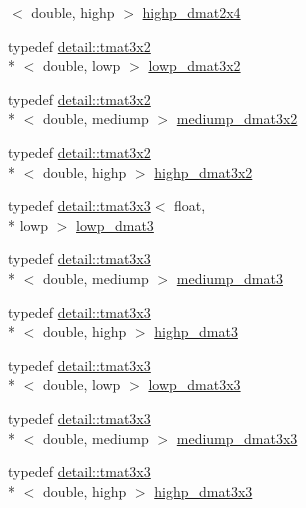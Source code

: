 \begin{DoxyCompactItemize}
$<$ double, highp $>$ \hyperlink{group__core__precision_gacd51d8188f7d66a83c035b8c4cd69f2d}{highp\-\_\-dmat2x4}
\item 
typedef \hyperlink{structglm_1_1detail_1_1tmat3x2}{detail\-::tmat3x2}\\*
$<$ double, lowp $>$ \hyperlink{group__core__precision_ga678c21e4fadeda255cfb146d40844bdd}{lowp\-\_\-dmat3x2}
\item 
typedef \hyperlink{structglm_1_1detail_1_1tmat3x2}{detail\-::tmat3x2}\\*
$<$ double, mediump $>$ \hyperlink{group__core__precision_gaff0060984716bcda68ff69ed27536bf6}{mediump\-\_\-dmat3x2}
\item 
typedef \hyperlink{structglm_1_1detail_1_1tmat3x2}{detail\-::tmat3x2}\\*
$<$ double, highp $>$ \hyperlink{group__core__precision_gac956fe6b946f0ccee78367ccd5427351}{highp\-\_\-dmat3x2}
\item 
typedef \hyperlink{structglm_1_1detail_1_1tmat3x3}{detail\-::tmat3x3}$<$ float, \\*
lowp $>$ \hyperlink{group__core__precision_ga07d9423bdde2d7ff880d6ece01dc9e32}{lowp\-\_\-dmat3}
\item 
typedef \hyperlink{structglm_1_1detail_1_1tmat3x3}{detail\-::tmat3x3}\\*
$<$ double, mediump $>$ \hyperlink{group__core__precision_ga80600af2c1ca11ead6123777185c372d}{mediump\-\_\-dmat3}
\item 
typedef \hyperlink{structglm_1_1detail_1_1tmat3x3}{detail\-::tmat3x3}\\*
$<$ double, highp $>$ \hyperlink{group__core__precision_ga993461e1d2caf19abd4f64d02ccdafa9}{highp\-\_\-dmat3}
\item 
typedef \hyperlink{structglm_1_1detail_1_1tmat3x3}{detail\-::tmat3x3}\\*
$<$ double, lowp $>$ \hyperlink{group__core__precision_gaea1bc4ede38e1b904f01ff5ce59210ea}{lowp\-\_\-dmat3x3}
\item 
typedef \hyperlink{structglm_1_1detail_1_1tmat3x3}{detail\-::tmat3x3}\\*
$<$ double, mediump $>$ \hyperlink{group__core__precision_ga2f73508d8192390ca9f9b569f544fade}{mediump\-\_\-dmat3x3}
\item 
typedef \hyperlink{structglm_1_1detail_1_1tmat3x3}{detail\-::tmat3x3}\\*
$<$ double, highp $>$ \hyperlink{group__core__precision_gad7229dea82287910d88e6e8566e39fc7}{highp\-\_\-dmat3x3}
\item 

\end{DoxyCompactItemize}
